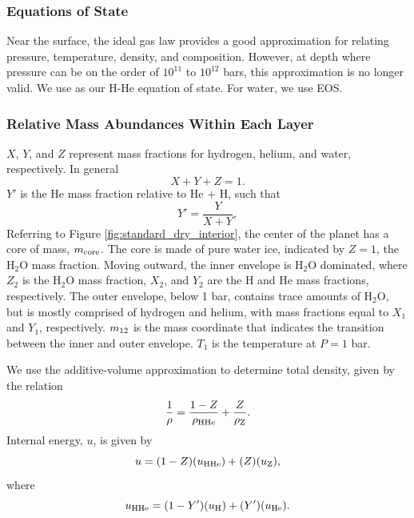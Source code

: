 \documentclass[11pt]{ucscthesisbs}
\begin{document}
\subsubsection{Equations of State}
Near the surface, the ideal gas law provides a good approximation for relating pressure, temperature, density, and composition. However, at depth where pressure can be on the order of $10^{11}$ to $10^{12}$ bars, this approximation is no longer valid. We use \citep{chabrier_eos} as our H-He equation of state. For water, we use \citep{mazevet_2019} EOS. 

\subsubsection{Relative Mass Abundances Within Each Layer}
$X$, $Y$, and $Z$ represent mass fractions for hydrogen, helium, and water, respectively. In general
\begin{equation}
  X + Y + Z = 1 .
\end{equation}
$Y'$ is the He mass fraction relative to He $+$ H, such that
\begin{equation}
  Y' = \frac{Y}{X+Y},
\end{equation}
Referring to Figure \ref{fig:standard_dry_interior}, the center of the planet has a core of mass, $m_{\rm core}$. The core is made of pure water ice, indicated by $Z = 1$, the H$_{2}$O mass fraction. Moving outward, the inner envelope is H$_{2}$O dominated, where $Z_{2}$ is the H$_{2}$O mass fraction, $X_{2}$, and $Y_{2}$ are the H and He mass fractions, respectively. The outer envelope, below 1 bar, contains trace amounts of H$_{2}$O, but is mostly comprised of hydrogen and helium, with mass fractions equal to $X_{1}$ and $Y_{1}$, respectively. $m_{\rm 12}$ is the mass coordinate that indicates the transition between the inner and outer envelope. $T_{1}$ is the temperature at $P=1$ bar. 

We use the additive-volume approximation to determine total density, given by the relation
\begin{equation}
  \frac{1}{\rho} = \frac{1-Z}{\rho_{\rm H He}} + \frac{Z}{\rho_{\rm Z}}.
\end{equation}
Internal energy, $u$, is given by
\begin{equation}
  u = (1-Z)(u_{\rm HHe}) + (Z) (u_{\rm Z}),
\end{equation}
where
\begin{equation}
 u_{\rm HHe} = (1-Y')(u_{\rm H}) + (Y')(u_{\rm He}).
\end{equation}
\end{document}
